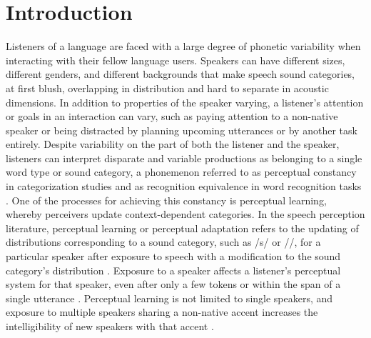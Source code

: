 
\chapter{Introduction}

Listeners of a language are faced with a large degree of phonetic variability when interacting with their fellow language users.  
Speakers can have different sizes, different genders, and different backgrounds that make speech sound categories, at first blush, overlapping in distribution and hard to separate in acoustic dimensions.
In addition to properties of the speaker varying, a listener's attention or goals in an interaction can vary, such as paying attention to a non-native speaker or being distracted by planning upcoming utterances or by another task entirely.  
Despite variability on the part of both the listener and the speaker, listeners can interpret disparate and variable productions as belonging to a single word type or sound category, a phonemenon referred to as perceptual constancy in categorization studies \citep{Shankweiler1977, Kuhl1979} and as recognition equivalence in word recognition tasks \citep{Sumner2013}.
One of the processes for achieving this constancy is perceptual learning, whereby perceivers update context-dependent categories.
In the speech perception literature, perceptual learning or perceptual adaptation refers to the updating of distributions corresponding to a sound category, such as /s/ or /\textesh/, for a particular speaker after exposure to speech with a modification to the sound category's distribution \citep{Norris2003}.
Exposure to a speaker affects a listener's perceptual system for that speaker,  even after only a few tokens \citep{Vroomen2007, Kraljic2008} or within the span of a single utterance \citep{Ladefoged1957}.
Perceptual learning is not limited to single speakers, and exposure to multiple speakers sharing a non-native accent increases the intelligibility of new speakers with that accent \citep{Bradlow2008}.

%

